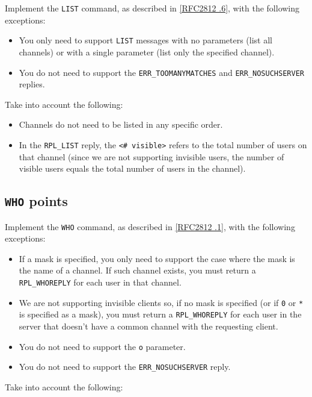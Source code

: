 \documentclass[10pt]{article}
\newcommand{\RFCsection}[2]{\href{http://tools.ietf.org/html/rfc#1\#section-#2}{[RFC#1 \textsection #2]}}
\newcommand{\points}[1]{{\sffamily\mdseries\guillemotleft #1 points\guillemotright{}}}
\begin{document}
Implement the \texttt{LIST} command, as described in \RFCsection{2812}{3.2.6}, with the following exceptions:

\begin{itemize}
\item You only need to support \texttt{LIST} messages with no parameters (list all channels) or with a single parameter (list only the specified channel).
\item You do not need to support the \texttt{ERR\_TOOMANYMATCHES} and \texttt{ERR\_NOSUCHSERVER} replies.
\end{itemize}

\noindent Take into account the following:

\begin{itemize}
\item Channels do not need to be listed in any specific order.
\item In the \texttt{RPL\_LIST} reply, the \texttt{<\# visible>} refers to the total number of users on that channel (since we are not supporting invisible users, the number of visible users equals the total number of users in the channel).
\end{itemize}


\subsection{\texttt{WHO} \points{5}}

Implement the \texttt{WHO} command, as described in \RFCsection{2812}{3.6.1}, with the following exceptions:

\begin{itemize}
\item If a mask is specified, you only need to support the case where the mask is the name of a channel. If such channel exists, you must return a \texttt{RPL\_WHOREPLY} for each user in that channel.
\item We are not supporting invisible clients so, if no mask is specified (or if \texttt{0} or \texttt{*} is specified as a mask), you must return a \texttt{RPL\_WHOREPLY} for each user in the server that doesn't have a common channel with the requesting client. 
\item You do not need to support the \texttt{o} parameter.
\item You do not need to support the \texttt{ERR\_NOSUCHSERVER} reply.
\end{itemize}

\noindent Take into account the following:
\end{document}
